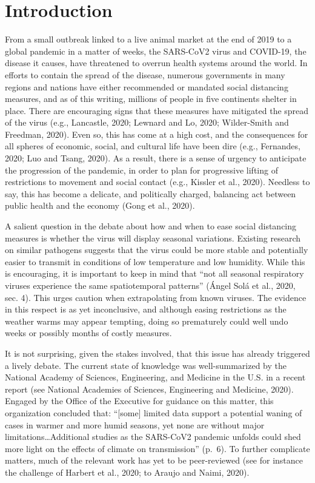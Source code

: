\documentclass[]{elsarticle} %
\begin{document}
\hypertarget{introduction}{%
\section{Introduction}\label{introduction}}

From a small outbreak linked to a live animal market at the end of 2019
to a global pandemic in a matter of weeks, the SARS-CoV2 virus and
COVID-19, the disease it causes, have threatened to overrun health
systems around the world. In efforts to contain the spread of the
disease, numerous governments in many regions and nations have either
recommended or mandated social distancing measures, and as of this
writing, millions of people in five continents shelter in place. There
are encouraging signs that these measures have mitigated the spread of
the virus (e.g., Lancastle, 2020; Lewnard and Lo, 2020; Wilder-Smith and
Freedman, 2020). Even so, this has come at a high cost, and the
consequences for all spheres of economic, social, and cultural life have
been dire (e.g., Fernandes, 2020; Luo and Tsang, 2020). As a result,
there is a sense of urgency to anticipate the progression of the
pandemic, in order to plan for progressive lifting of restrictions to
movement and social contact (e.g., Kissler et al., 2020). Needless to
say, this has become a delicate, and politically charged, balancing act
between public health and the economy (Gong et al., 2020).

A salient question in the debate about how and when to ease social
distancing measures is whether the virus will display seasonal
variations. Existing research on similar pathogens suggests that the
virus could be more stable and potentially easier to transmit in
conditions of low temperature and low humidity. While this is
encouraging, it is important to keep in mind that ``not all seasonal
respiratory viruses experience the same spatiotemporal patterns'' (Ángel
Solá et al., 2020, sec. 4). This urges caution when extrapolating from
known viruses. The evidence in this respect is as yet inconclusive, and
although easing restrictions as the weather warms may appear tempting,
doing so prematurely could well undo weeks or possibly months of costly
measures.

It is not surprising, given the stakes involved, that this issue has
already triggered a lively debate. The current state of knowledge was
well-summarized by the National Academy of Sciences, Engineering, and
Medicine in the U.S. in a recent report (see National Academies of
Sciences, Engineering and Medicine, 2020). Engaged by the Office of the
Executive for guidance on this matter, this organization concluded that:
``{[}some{]} limited data support a potential waning of cases in warmer
and more humid seasons, yet none are without major
limitations\ldots Additional studies as the SARS-CoV2 pandemic unfolds
could shed more light on the effects of climate on transmission''
(p.~6). To further complicate matters, much of the relevant work has yet
to be peer-reviewed (see for instance the challenge of Harbert et al.,
2020; to Araujo and Naimi, 2020).
\end{document}

